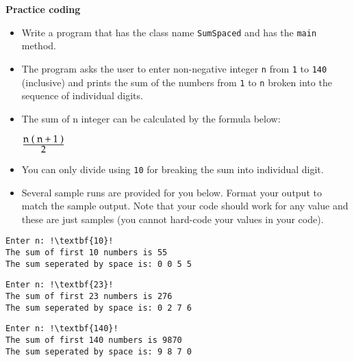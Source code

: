 \documentclass[12pt]{article}
\begin{document}
\vspace*{0.5cm}
\textbf{Practice coding}
\begin{itemize}
	\item Write a program that has the class name \texttt{SumSpaced} and has the \texttt{main} method.
	\item The program asks the user to enter non-negative integer \texttt{n} from \texttt{1} to \texttt{140} (inclusive) and prints the sum of the numbers from \texttt{1} to \texttt{n} broken into the sequence of individual digits.
	\item The sum of  n integer can be calculated by the formula below:
\begin{center}
	$\rm\frac{\mathtt{\displaystyle}\displaystyle n \;(\;n+1\;)}{\displaystyle 2}$
\end{center}	
	\item You can only divide using \texttt{10} for breaking the sum into individual digit.
	\item Several sample runs are provided for you below. Format your output to match the sample output. Note that your code should work for any value and these are just samples (you cannot hard-code your values in your code).
\end{itemize}
\begin{center}
\begin{minipage}{6.5cm}
\begin{lstlisting}[escapechar=!]
Enter n: !\textbf{10}!
The sum of first 10 numbers is 55
The sum seperated by space is: 0 0 5 5
\end{lstlisting}
\end{minipage}
\hspace*{0.5cm}
\begin{minipage}{6.5cm}
\begin{lstlisting}[escapechar=!]
Enter n: !\textbf{23}!
The sum of first 23 numbers is 276
The sum seperated by space is: 0 2 7 6
\end{lstlisting}
\end{minipage}
\hspace*{0.5cm}
\begin{minipage}{6.5cm}
\begin{lstlisting}[escapechar=!]
Enter n: !\textbf{140}!
The sum of first 140 numbers is 9870
The sum seperated by space is: 9 8 7 0
\end{lstlisting}
\end{minipage}
\end{center}
	
\end{document}
